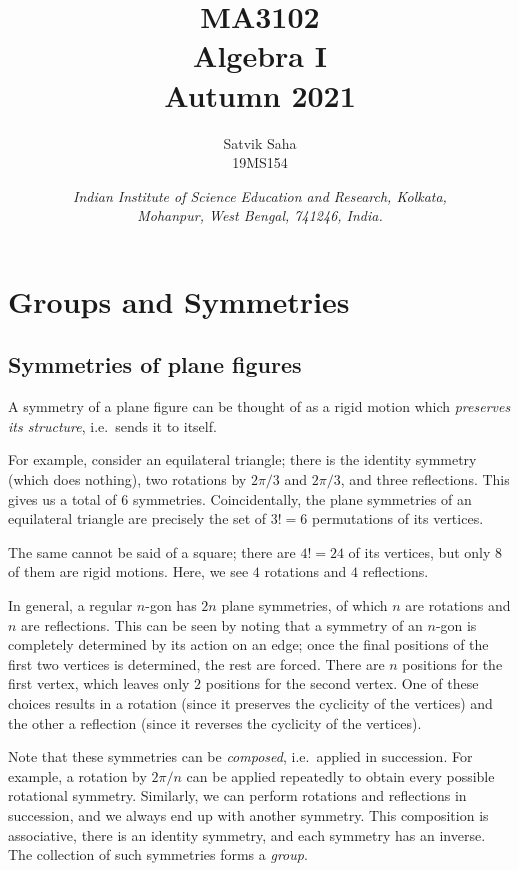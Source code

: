 \documentclass[11pt]{article}
\title{
    \Large\textsc{MA3102} \\
    \Huge \textbf{Algebra I} \\
    \vspace{5pt}
    \Large{Autumn 2021}
}
\author{
    \large Satvik Saha
    \\\textsc{\small 19MS154}
}
\date{\normalsize
    \textit{Indian Institute of Science Education and Research, Kolkata, \\
    Mohanpur, West Bengal, 741246, India.} \\
}
\theoremstyle{definition}
\theoremstyle{remark}
\numberwithin{equation}{section}
\begin{document}
    \maketitle

    \tableofcontents

    \section{Groups and Symmetries}
    \subsection{Symmetries of plane figures}
    A symmetry of a plane figure can be thought of as a rigid motion which
    \emph{preserves its structure}, i.e.\ sends it to itself.

    For example, consider an equilateral triangle; there is the identity symmetry
    (which does nothing), two rotations by $2\pi / 3$ and $2\pi / 3$, and three
    reflections. This gives us a total of $6$ symmetries. Coincidentally, the plane
    symmetries of an equilateral triangle are precisely the set of $3! = 6$
    permutations of its vertices.

    The same cannot be said of a square; there are $4! = 24$ of its vertices, but
    only $8$ of them are rigid motions. Here, we see $4$ rotations and $4$
    reflections.

    In general, a regular $n$-gon has $2n$ plane symmetries, of which $n$ are
    rotations and $n$ are reflections. This can be seen by noting that a symmetry of
    an $n$-gon is completely determined by its action on an edge; once the final
    positions of the first two vertices is determined, the rest are forced. There are
    $n$ positions for the first vertex, which leaves only $2$ positions for the
    second vertex. One of these choices results in a rotation (since it preserves the
    cyclicity of the vertices) and the other a reflection (since it reverses the
    cyclicity of the vertices).

    Note that these symmetries can be \emph{composed}, i.e.\ applied in succession.
    For example, a rotation by $2\pi / n$ can be applied repeatedly to obtain every
    possible rotational symmetry. Similarly, we can perform rotations and reflections
    in succession, and we always end up with another symmetry. This composition is
    associative, there is an identity symmetry, and each symmetry has an inverse.
    The collection of such symmetries forms a \emph{group}.
\end{document}
